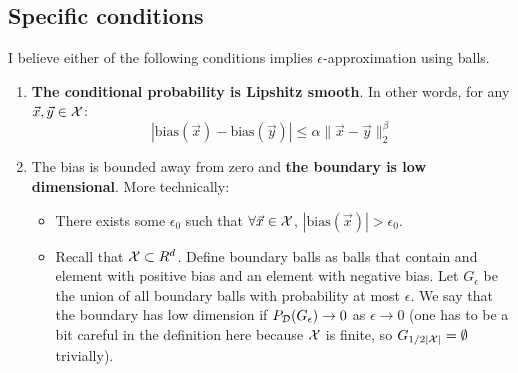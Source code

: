 \documentclass{article}
\newcommand{\X}{{\cal X}}
\newcommand{\D}{{\cal D}}
\newcommand{\x}{\vec{x}}
\newcommand{\y}{\vec{y}}
\newcommand{\bias}{\text{bias}}
\begin{document}
\subsection{Specific conditions}

I believe either of the following conditions implies
$\epsilon$-approximation using balls.

\begin{enumerate}
\item
  {\bf The conditional probability is Lipshitz smooth}. In other words, for
any $\x,\y \in \X$:
\[
|\bias(\x) - \bias(\y)| \leq \alpha \|\x-\y\|_2^{\beta}
\]
\item
The bias is bounded away from zero and {\bf the boundary is low
dimensional}. More technically:
\begin{itemize}
\item There exists some $\epsilon_0$ such that $\forall \x \in \X$, $|\bias(\x)|>\epsilon_0$.
\item Recall that $\X \subset R^d$. Define boundary balls as balls
  that contain and element with positive bias and an element with
  negative bias. Let $G_{\epsilon}$ be the union of all boundary balls
  with probability at most $\epsilon$. We say that the boundary has
  low dimension if $P_{\D}(G_{\epsilon}) \to 0$ as $\epsilon \to 0$
  (one has to be a bit careful in the definition here because $\X$ is finite, so
  $G_{1/2|\X|}=\emptyset$ trivially).  
\end{itemize}
\end{enumerate}


\appendix
\end{document}
